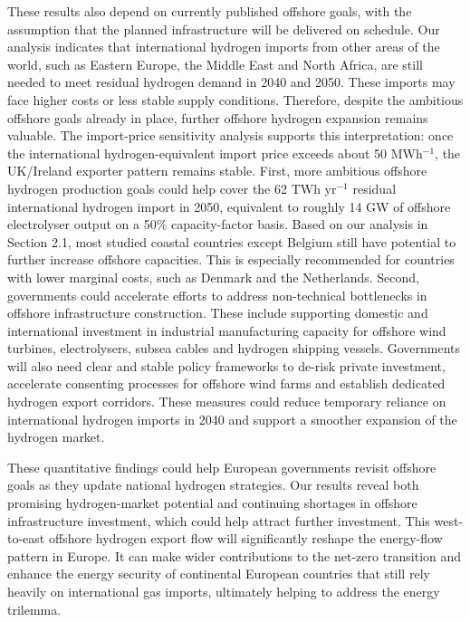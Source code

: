 \documentclass[pdflatex,sn-mathphys,Numbered]{sn-jnl}%
\begin{document}
These results also depend on currently published offshore goals, with the assumption that the planned infrastructure will be delivered on schedule.
Our analysis indicates that international hydrogen imports from other areas of the world, such as Eastern Europe, the Middle East and North Africa, are still needed to meet residual hydrogen demand in 2040 and 2050. These imports may face higher costs or less stable supply conditions. Therefore, despite the ambitious offshore goals already in place, further offshore hydrogen expansion remains valuable.
The import-price sensitivity analysis supports this interpretation: once the international hydrogen-equivalent import price exceeds about 50 \texteuro{} MWh$^{-1}$, the UK/Ireland exporter pattern remains stable.
First, more ambitious offshore hydrogen production goals could help cover the 62 TWh yr$^{-1}$ residual international hydrogen import in 2050, equivalent to roughly 14 GW of offshore electrolyser output on a 50\% capacity-factor basis. Based on our analysis in Section 2.1, most studied coastal countries except Belgium still have potential to further increase offshore capacities. This is especially recommended for countries with lower marginal costs, such as Denmark and the Netherlands.
Second, governments could accelerate efforts to address non-technical bottlenecks in offshore infrastructure construction. These include supporting domestic and international investment in industrial manufacturing capacity for offshore wind turbines, electrolysers, subsea cables and hydrogen shipping vessels. Governments will also need clear and stable policy frameworks to de-risk private investment, accelerate consenting processes for offshore wind farms and establish dedicated hydrogen export corridors. These measures could reduce temporary reliance on international hydrogen imports in 2040 and support a smoother expansion of the hydrogen market.

These quantitative findings could help European governments revisit offshore goals as they update national hydrogen strategies. Our results reveal both promising hydrogen-market potential and continuing shortages in offshore infrastructure investment, which could help attract further investment.
This west-to-east offshore hydrogen export flow will significantly reshape the energy-flow pattern in Europe.
It can make wider contributions to the net-zero transition and enhance the energy security of continental European countries that still rely heavily on international gas imports, ultimately helping to address the energy trilemma.
\end{document}
